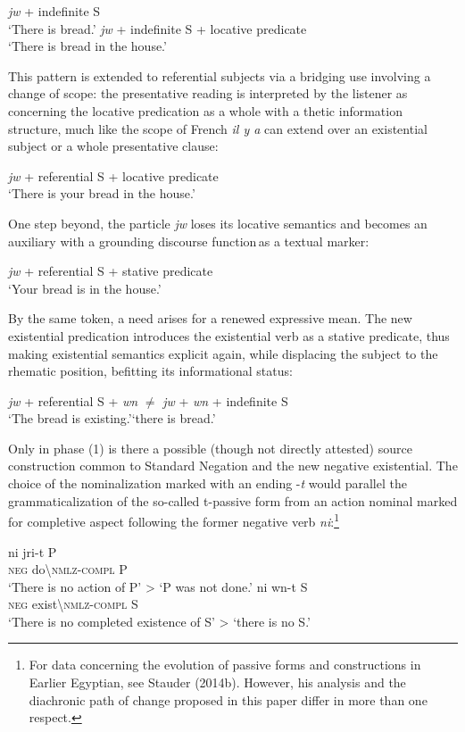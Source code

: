 \documentclass[output=paper]{langsci/langscibook}
\begin{document}
\ea 
    \ea \textit{jw} + indefinite S\\ 
    \glt ‘There is bread.’ 
    \ex \textit{jw} + indefinite S + locative predicate\\
    \glt ‘There is bread in the house.’ 
\z \z 

This pattern is extended to referential subjects via a bridging use involving a change of scope: the presentative reading is interpreted by the listener as concerning the locative predication as a whole with a thetic information structure, much like the scope of French \textit{il y a} can extend over an existential subject or a whole presentative clause: 

\ea \textit{jw} + referential S + locative predicate\\  
    \glt ‘There is your bread in the house.’ 
\z

One step beyond, the particle \textit{jw} loses its locative semantics and becomes an auxiliary with a grounding discourse function as a textual marker: 
 
\ea  \textit{jw} + referential S + stative predicate\\ 
    \glt ‘Your bread is in the house.’ 
\z 

By the same token, a need arises for a renewed expressive mean. The new existential predication introduces the existential verb as a stative predicate, thus making existential semantics explicit again, while displacing the subject to the rhematic position, befitting its informational status:  
 
\ea  \textit{jw} + referential S + \textit{wn} $≠$ \textit{jw} + \textit{wn} + indefinite S\\ 
    \glt ‘The bread is existing.’‘there is bread.’ 
\z 

Only in phase (1) is there a possible (though not directly attested) source construction common to Standard Negation and the new negative existential. The choice of the nominalization marked with an ending -\textit{t} would parallel the grammaticalization of the so-called t-passive form from an action nominal marked for completive aspect following the former negative verb \textit{ni}:\footnote{For data concerning the evolution of passive forms and constructions in Earlier Egyptian, see Stauder (2014b). However, his analysis and the diachronic path of change proposed in this paper differ in more than one respect.}

\ea 
    \ea 
    \gll ni jri-t P\\ 
    \textsc{neg} do\textbackslash\textsc{nmlz-compl} P\\ 
    \glt ‘There is no action of P’ > ‘P was not done.’ 
    \ex 
    \gll ni wn-t S\\ 
    \textsc{neg} exist\textbackslash\textsc{nmlz-compl} S\\
    \glt ‘There is no completed existence of S’ > ‘there is no S.’ 
\z \z
\end{document}

